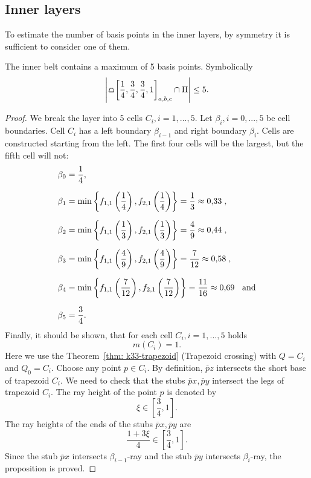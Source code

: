\subsection{Inner layers}
To estimate the number of basis points in the inner layers, by symmetry it is sufficient to consider one of them.

\begin{proposition}
\label{prop: inner-layer}
The inner belt contains a maximum of 5 basis points. Symbolically
$$
\left|
\tpz{\left[ \frac{1}{4},\frac{3}{4},\frac{3}{4},1 \right]_{a,b,c} } \cap \Pi
\right| \leq 5.
$$
\end{proposition}

\begin{proof}
We break the layer into 5 cells $C_{i}, i = 1,...,5$. Let $\beta_{i}, i = 0,...,5$ be cell boundaries. Cell $C_{i}$ has a left boundary $\beta_{i-1}$ and right boundary $\beta_{i}$. Cells are constructed starting from the left. The first four cells will be the largest, but the fifth cell will not:
\begin{align*}
\beta_{0} &= \frac{1}{4}, \\[6pt]%
\beta_{1} &= \min\left\{ f_{1,1}\left(\frac{1}{4}\right), f_{2,1}\left(\frac{1}{4}\right) \right\} = \frac{1}{3} \approx 0{,}33\text{\hspace{0.1cm}},\\[6pt]%
\beta_{2} &= \min\left\{ f_{1,1}\left(\frac{1}{3}\right), f_{2,1}\left(\frac{1}{3}\right) \right\} = \frac{4}{9} \approx 0{,}44\text{\hspace{0.1cm}},\\[6pt]%
\beta_{3} &= \min\left\{ f_{1,1}\left(\frac{4}{9}\right), f_{2,1}\left(\frac{4}{9}\right) \right\} = \frac{7}{12} \approx 0{,}58\text{\hspace{0.1cm}},\\[6pt]%
\beta_{4} &= \min\left\{ f_{1,1}\left(\frac{7}{12}\right), f_{2,1}\left(\frac{7}{12}\right) \right\} = \frac{11}{16} \approx 0{,}69\text{\hspace{0.2cm} and}\\[6pt]%
\beta_{5} &= \frac{3}{4}.
\end{align*}
Finally, it should be shown, that for each cell $C_{i},i=1,...,5$ holds
$$
m(C_{i}) = 1.
$$
Here we use the Theorem~\ref{thm: k33-trapezoid} (Trapezoid crossing) with $Q = C_{i}$ and $Q_{0} = C_{i}$. Choose any point $p \in C_{i}$. By definition, $\overline{p}z$ intersects the short base of trapezoid $C_{i}$. We need to check that the stubs $\overline{p}x, \overline{p}y$ intersect the legs of trapezoid $C_{i}$. The ray height of the point $p$ is denoted by
$$
\xi \in \left[\frac{3}{4}, 1 \right].
$$
The ray heights of the ends of the stubs $\overline{p}x, \overline{p}y$ are
$$
\frac{1+3\xi}{4} \in \left[\frac{3}{4}, 1 \right].
$$
Since the stub $\overline{p}x$ intersects $\beta_{i-1}$-ray and the stub $\overline{p}y$ intersects $\beta_{i}$-ray, the proposition is proved.
\end{proof}

